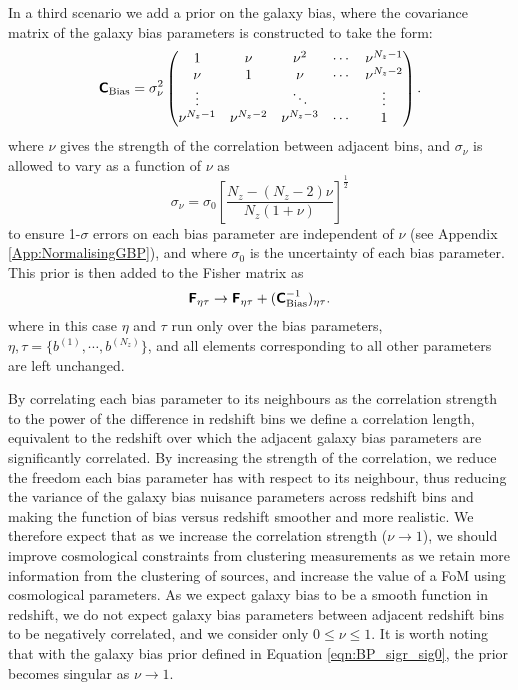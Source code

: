 \documentclass[useAMS,usenatbib,times,letter,amssymb]{mn2e}
\def\be{\begin{equation}}
\def\ee{\end{equation}}
\begin{document}

In a third scenario we add a prior on the galaxy bias, where the covariance matrix of the galaxy bias parameters is constructed to take the form:
\be\label{Eqn:BiasPriorCov}
\mathbfss{C}_{{\rm Bias}} = \sigma_\nu^2 \begin{pmatrix} 1 & \nu & \nu^2  & \cdots & \nu^{N_z-1}\\ \nu & 1 & \nu & \cdots & \nu^{N_z-2} \\  \vdots &  & \ddots & & \vdots \\  \nu^{N_z-1} & \nu^{N_z-2} & \nu^{N_z-3} & \cdots & 1\end{pmatrix}.
\ee
where $\nu$ gives the strength of the correlation between adjacent bins, and $\sigma_\nu$ is allowed to vary as a function of $\nu$ as
\be\label{eqn:BP_sigr_sig0}
\sigma_\nu = \sigma_0\left[\frac{N_z-(N_z-2)\nu}{N_z(1+\nu)}\right]^{\frac{1}{2}}
\ee
to ensure 1-$\sigma$ errors on each bias parameter are independent of $\nu$ (see Appendix \ref{App:NormalisingGBP}), and where $\sigma_0$ is the uncertainty of each bias parameter. This prior is then added to the Fisher matrix as 
\be
\mathbfss{F}_{\eta\tau} \to \mathbfss{F}_{\eta\tau} + (\mathbfss{C}^{-1}_{\rm Bias})_{{\eta\tau}}.
\ee
where in this case $\eta$ and $\tau$ run only over the bias parameters, $\eta,\tau = \{b^{(1)},\cdots,b^{(N_z)}\}$, and all elements corresponding to all other parameters are left unchanged.

 By correlating each bias parameter to its neighbours as the correlation strength to the power of the difference in redshift bins we define a correlation length, equivalent to the redshift over which the adjacent galaxy bias parameters are significantly correlated. By increasing the strength of the correlation, we reduce the freedom each bias parameter has with respect to its neighbour, thus reducing the variance of the galaxy bias nuisance parameters across redshift bins and making the function of bias versus redshift smoother and more realistic. We therefore expect that as we increase the correlation strength ($\nu\to1$), we should improve cosmological constraints from clustering measurements as we retain more information from the clustering of sources, and increase the value of a FoM using cosmological parameters. As we expect galaxy bias to be a smooth function in redshift, we do not expect galaxy bias parameters between adjacent redshift bins to be negatively correlated, and we consider only $0\le \nu \le 1$. It is worth noting that with the galaxy bias prior defined in Equation \ref{eqn:BP_sigr_sig0}, the prior becomes singular as $\nu\to 1$.
 
\end{document}

